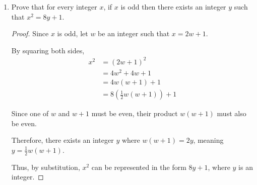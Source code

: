 \documentclass{article}
\begin{document}
\begin{enumerate}
  \item Prove that for every integer $x$, if $x$ is odd then there
    exists an integer $y$ such that $x^2 = 8y + 1$.

    \begin{proof}
      Since $x$ is odd, let $w$ be an integer such that $x=2w+1$.

      By squaring both sides,
      \begin{align}
        x^2 &= (2w+1)^2 \\
        &= 4w^2+4w+1 \\
        &= 4w(w+1)+1 \\
        &= 8(\frac{1}{2}w(w+1))+1
      \end{align}

      Since one of $w$ and $w+1$ must be even, their product $w(w+1)$
      must also be even.

      Therefore, there exists an integer $y$ where $w(w+1)=2y$,
      meaning $y=\frac{1}{2}w(w+1)$.

      Thus, by substitution, $x^2$ can be represented in the form
      $8y+1$, where $y$ is an integer.
    \end{proof}

\end{enumerate}
\end{document}
